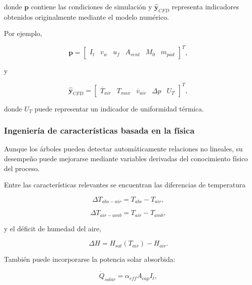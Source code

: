 donde $\mathbf{p}$ contiene las condiciones de simulación y $\hat{\mathbf{y}}_{CFD}$ representa indicadores obtenidos originalmente mediante el modelo numérico.

Por ejemplo,

\begin{equation}
\mathbf{p}
=
\begin{bmatrix}
I_t &
v_w &
u_f &
A_{vent} &
M_0 &
m_{pad}
\end{bmatrix}^{T},
\end{equation}

y

\begin{equation}
\hat{\mathbf{y}}_{CFD}
=
\begin{bmatrix}
\overline{T}_{air} &
T_{max} &
\overline{v}_{air} &
\Delta p &
U_T
\end{bmatrix}^{T},
\end{equation}

donde $U_T$ puede representar un indicador de uniformidad térmica.

\subsubsection{Ingeniería de características basada en la física}

Aunque los árboles pueden detectar automáticamente relaciones no lineales, su desempeño puede mejorarse mediante variables derivadas del conocimiento físico del proceso.

Entre las características relevantes se encuentran las diferencias de temperatura

\begin{equation}
\Delta T_{abs-air}
=
T_{abs}-T_{air},
\end{equation}

\begin{equation}
\Delta T_{air-amb}
=
T_{air}-T_{amb},
\end{equation}

y el déficit de humedad del aire,

\begin{equation}
\Delta H
=
H_{sat}(T_{air})-H_{air}.
\end{equation}

También puede incorporarse la potencia solar absorbida:

\begin{equation}
\dot{Q}_{solar}
=
\alpha_{eff}A_{cap}I_t,
\end{equation}


